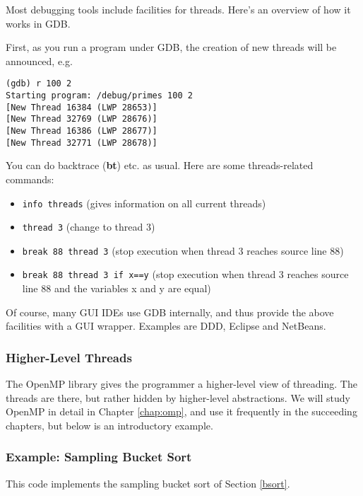 Most debugging tools include facilities for threads.  Here's an overview
of how it works in GDB.

First, as you run a program under GDB, the creation of new threads will
be announced, e.g.

\begin{Verbatim}
(gdb) r 100 2
Starting program: /debug/primes 100 2
[New Thread 16384 (LWP 28653)]
[New Thread 32769 (LWP 28676)]
[New Thread 16386 (LWP 28677)]
[New Thread 32771 (LWP 28678)]
\end{Verbatim}

You can do backtrace ({\bf bt}) etc. as usual.  Here are some
threads-related commands:

\begin{itemize}

\item {\tt info threads} (gives information on all current threads)

\item {\tt thread 3} (change to thread 3)

\item {\tt break 88 thread 3} (stop execution when thread 3 reaches
source line 88)

\item {\tt break 88 thread 3 if x==y} (stop execution when thread 3 reaches
source line 88 and the variables x and y are equal)

\end{itemize}

Of course, many GUI IDEs use GDB internally, and thus provide the above
facilities with a GUI wrapper.  Examples are DDD, Eclipse and NetBeans.

\subsubsection{Higher-Level Threads}

The OpenMP library gives the programmer a higher-level view of
threading.  The threads are there, but rather hidden by higher-level
abstractions.  We will study OpenMP in detail in Chapter \ref{chap:omp},
and use it frequently in the succeeding chapters, but below is an
introductory example.

\subsubsection{Example:  Sampling Bucket Sort}
\label{ompbsort}

This code implements the sampling bucket sort of Section \ref{bsort}.

